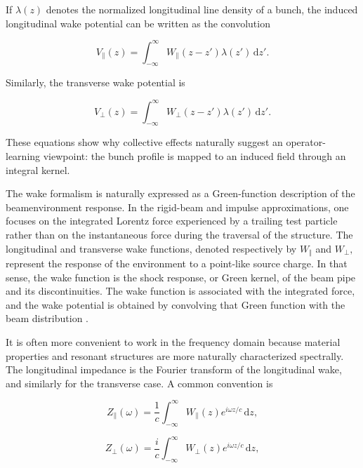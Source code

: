 If \(\lambda ( z )\) denotes the normalized longitudinal line density of a bunch, the induced longitudinal wake potential can be written as the convolution

\begin{equation}
\label{eq:8}
V_{\parallel}(z)=\int_{-\infty}^{\infty}W_{\parallel}(z-z')\lambda(z')\,\mathrm{d}z'.
\end{equation}

Similarly, the transverse wake potential is

\begin{equation}
\label{eq:9}
V_{\perp}(z)=\int_{-\infty}^{\infty}W_{\perp}(z-z')\lambda(z')\,\mathrm{d}z'.
\end{equation}

These equations show why collective effects naturally suggest an operator-learning viewpoint: the bunch profile is mapped to an induced field through an integral kernel.

The wake formalism is naturally expressed as a Green-function description of the beamenvironment response. In the rigid-beam and impulse approximations, one focuses on the integrated Lorentz force experienced by a trailing test particle rather than on the instantaneous force during the traversal of the structure. The longitudinal and transverse wake functions, denoted respectively by \(W_{\Vert}\) and \(W_{\perp} ,\) represent the response of the environment to a point-like source charge. In that sense, the wake function is the shock response, or Green kernel, of the beam pipe and its discontinuities. The wake function is associated with the integrated force, and the wake potential is obtained by convolving that Green function with the beam distribution \cite{metral2021wake}.

It is often more convenient to work in the frequency domain because material properties and resonant structures are more naturally characterized spectrally. The longitudinal impedance is the Fourier transform of the longitudinal wake, and similarly for the transverse case. A common convention is

\begin{equation}
\label{eq:10}
Z_{\parallel}(\omega)=\frac1c\int_{-\infty}^{\infty}W_{\parallel}(z)e^{i\omega z/c}\,\mathrm{d}z,
\end{equation}

\begin{equation}
\label{eq:11}
Z_{\perp}(\omega)=\frac{i}{c}\int_{-\infty}^{\infty}W_{\perp}(z)e^{i\omega z/c}\,\mathrm{d}z,
\end{equation}

